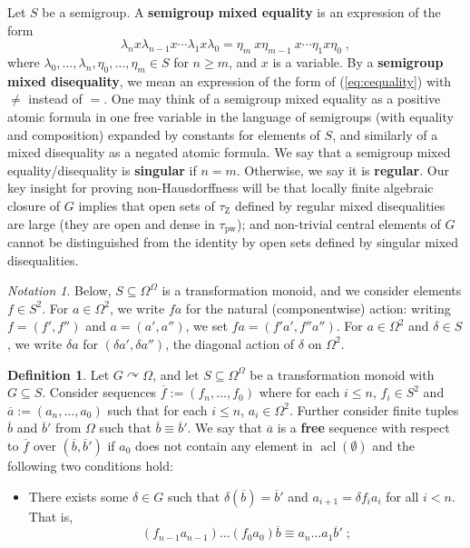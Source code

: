\documentclass{article}
\theoremstyle{remark}
\newtheorem{notation}[theorem]{Notation}
\theoremstyle{definition}
\newtheorem{definition}[theorem]{Definition}
\def\acts{\curvearrowright}
\DeclareMathOperator{\acl}{acl}
\def\a{\overline{a}}
\def\b{\overline{b}}
\def\f{\overline{f}}
\newcommand{\pw}[0]{\tau_{\mathrm{pw}}}
\newcommand{\zar}[0]{\tau_{\mathrm{Z}}}
\newcommand{\orq}[0]{\equiv}
\renewcommand\leq{\leqslant}
\renewcommand\geq{\geqslant}
\begin{document}
{{{{{Let $S$ be a semigroup. A \textbf{semigroup mixed equality} is an expression of the form
\begin{equation}\label{eq:cequality}
   \lambda_{n}  x \lambda_{n-1}  x \cdots   \lambda_1 x \lambda_0= \eta_{m}\  x \eta_{m-1} \ x \cdots  \eta_1 
   x  \eta_0\;,
\end{equation}
where $\lambda_0, \dots, \lambda_n,\eta_0,\dots, \eta_m\in S$ for $n\geq m$, and $x$ is a variable. By a \textbf{semigroup mixed disequality}, we mean an expression of the form of (\ref{eq:cequality}) with $\neq$ instead of $=$. One may think of a semigroup mixed equality as a positive atomic formula in one free variable in the language of semigroups (with equality and composition) expanded by constants for elements of $S$, and similarly of a mixed disequality as a negated atomic formula. We say that a semigroup mixed equality/disequality is \textbf{singular} if $n=m$. Otherwise, we say it is \textbf{regular}. {Our key insight for proving non-Hausdorffness will be that locally finite algebraic closure of $G$ implies that  open sets of $\zar$ defined by regular mixed disequalities are large (they are open and dense in $\pw$); and non-trivial central elements of $G$ cannot be distinguished from the identity  by open sets defined by singular mixed disequalities.}




\begin{notation} 
{Below, $S\subseteq \Omega^\Omega$ is a transformation monoid, and we consider elements $f \in S^2$. For $a \in \Omega^2$, we write $fa$ for the natural (componentwise) action: writing $f = (f', f'')$ and $a = (a', a'')$, we set $fa = (f'a', f''a'')$. For $a \in \Omega^2$ and $\delta \in S$, we write $\delta a$ for $(\delta a', \delta a'')$, the diagonal action of $\delta$ on $\Omega^2$.}
\end{notation}
\begin{definition}\label{def:freesequence} Let $G\acts\Omega$, and let $S\subseteq \Omega^\Omega$ be a {transformation monoid} with $G\subseteq S$. %
 Consider sequences $\overline{f}:=(f_{n}, \dots, f_0)$ where for each $i\leq n$, $f_i\in S^2$ and $\a:=(a_{n}, \dots, a_0)$ such that for each $i\leq n$, $a_i\in\Omega^2$. Further consider finite tuples $\b$ and $\b'$ from $\Omega$ such that
$\b\orq \b'$. We say that $\a$ is a \textbf{free} sequence with respect to $\f$ over $(\b, \b')$ if {$a_0$ does not contain any element in $\acl(\emptyset)$ and } the following two conditions hold:
\begin{itemize} 
\item  There exists some $\delta\in G$ such that $\delta(\overline{b})=\overline{b}'$ and $a_{i+1}=\delta f_i a_i$ for all $i<n$. That is,
\[ %
(f_{n-1} a_{n-1}) \dots (f_{0}a_{0})\b\orq %
a_n\dots a_1\b'\;;\] 


\end{itemize}
\end{definition}}}}}}
\end{document}
